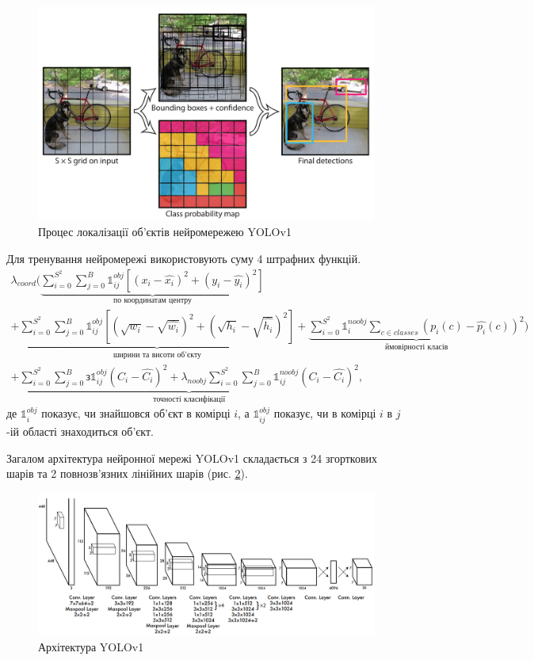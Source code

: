 \begin{figure}[H]
    \includegraphics[width=0.45\linewidth]{images/cnn_yolo1}
    \centering
    \caption{Процес локалізації об'єктів нейромережею YOLOv1 \cite{bib:yolov1}
        \label{fig:yolov1:detection_process}
    }
\end{figure}
Для тренування нейромережі використовують суму 4 штрафних функцій.
\begin{multline*}
    \lambda_{coord}(
    \underbrace{ \sum_{i=0}^{S^2} \sum_{j=0}^{B}
    \mathds{1}_{ij}^{obj} [(x_i - \widehat{x_i})^2 + (y_i - \widehat{y_i})^2]
    }_\textrm{по координатам центру}\\
    +
    \underbrace{
    \sum_{i=0}^{S^2} \sum_{j=0}^{B}
    \mathds{1}_{ij}^{obj} [(\sqrt{w_i} - \sqrt{\widehat{w_i}})^2 + (\sqrt{h_i} - \sqrt{\widehat{h_i}})^2]
    }_\textrm{ширини та висоти об'єкту}
    +  \underbrace{
        \sum_{i=0}^{S^2} \mathds{1}_{i}^{noobj}\sum_{c \in classes}(p_i(c) -  \widehat{p_i}(c))^2
        }_\textrm{ймовірності класів}
    )\\
    +  \underbrace{
        \sum_{i=0}^{S^2} \sum_{j=0}^{B} з
        \mathds{1}_{ij}^{obj} (C_i - \widehat{C_i})^2
        +
        \lambda_{noobj} \sum_{i=0}^{S^2} \sum_{j=0}^{B} \mathds{1}_{ij}^{noobj} (C_i - \widehat{C_i})^2
    }_\textrm{точності класифікації},
\end{multline*}
де $\mathds{1}_{i}^{obj}$ показує, чи знайшовся об'єкт в комірці $i$, а
$\mathds{1}_{ij}^{obj}$ показує, чи в комірці $i$ в $j$-ій області знаходиться об'єкт.

Загалом архітектура нейронної мережі YOLOv1 складається з 24 згорткових шарів та
2 повнозв'язних лінійних шарів (рис. \ref{fig:yolov1:architecture}).

\begin{figure}[H]
    \includegraphics[width=0.8\linewidth]{images/cnn_yolo2}
    \centering
    \caption{Архітектура YOLOv1 \cite{bib:yolov1}
        \label{fig:yolov1:architecture}
    }
\end{figure}

